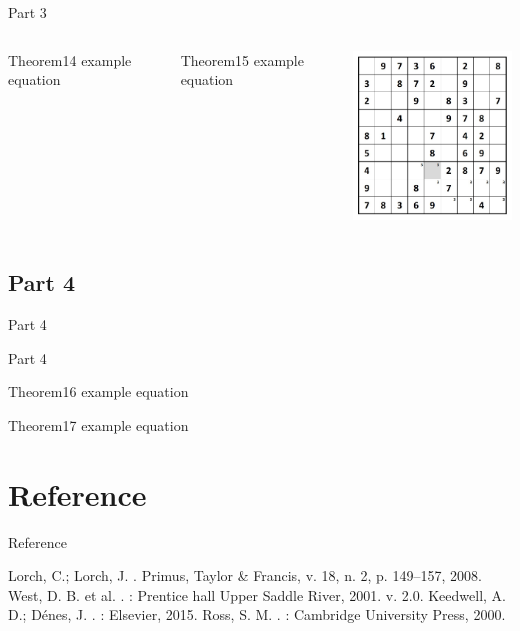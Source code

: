 \documentclass[xcolor=dvipsnames,table]{beamer}
\begin{document}

\begin{frame}{Part 3}
	\begin{columns}
	\begin{block}{Theorem14}{}
		example equation
	\end{block}		
	\begin{block}{Theorem15}{}
example equation
	\end{block}
		\includegraphics[width=5cm]{images/imagem23}
	\end{columns}
\end{frame}


\subsection{Part 4}{Part 4}
	\begin{frame}{Part 4}
		
		\begin{block}{Theorem16}{}
			example equation
		\end{block}
		\begin{alertblock}{Theorem17} 
			example equation
		\end{alertblock}
	\end{frame}

	
\section{Reference}
	\begin{frame}{Reference}
		\begin{thebibliography}{}
			\beamertemplatearticlebibitems
			 Lorch, C.; Lorch, J.
			. \newblock Primus, Taylor \& Francis, v. 18, n. 2, p. 149–157, 2008.
			\beamertemplatebookbibitems
			 West, D. B. et al.
			. \newblock [S.l.]: Prentice hall Upper Saddle River,
			2001. v. 2.0.
			\beamertemplatebookbibitems
			 Keedwell, A. D.; Dénes, J.
			. \newblock [S.l.]: Elsevier, 2015.
			\beamertemplatebookbibitems
			 Ross, S. M.
			. \newblock [S.l.]: Cambridge University Press, 2000.
		\end{thebibliography}
	\end{frame}

	
\end{document}
